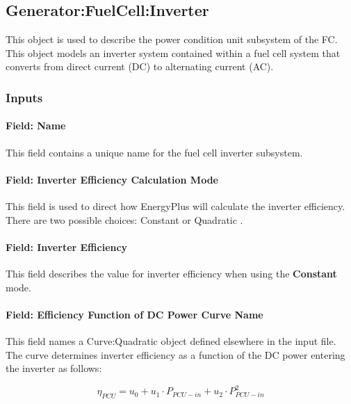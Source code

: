 \subsection{Generator:FuelCell:Inverter}\label{generatorfuelcellinverter}

This object is used to describe the power condition unit subsystem of the FC. This object models an inverter system contained within a fuel cell system that converts from direct current (DC) to alternating current (AC).

\subsubsection{Inputs}\label{inputs-18-000}

\paragraph{Field: Name}\label{field-name-21}

This field contains a unique name for the fuel cell inverter subsystem.

\paragraph{Field: Inverter Efficiency Calculation Mode}\label{field-inverter-efficiency-calculation-mode}

This field is used to direct how EnergyPlus will calculate the inverter efficiency. There are two possible choices: Constant or Quadratic .

\paragraph{Field: Inverter Efficiency}\label{field-inverter-efficiency-1}

This field describes the value for inverter efficiency when using the \textbf{Constant} mode.

\paragraph{Field: Efficiency Function of DC Power Curve Name}\label{field-efficiency-function-of-dc-power-curve-name}

This field names a Curve:Quadratic object defined elsewhere in the input file. The curve determines inverter efficiency as a function of the DC power entering the inverter as follows:

\begin{equation}
{\eta_{PCU}} = {u_0} + {u_1} \cdot {P_{PCU - in}} + {u_2} \cdot P_{PCU - in}^2
\end{equation}

